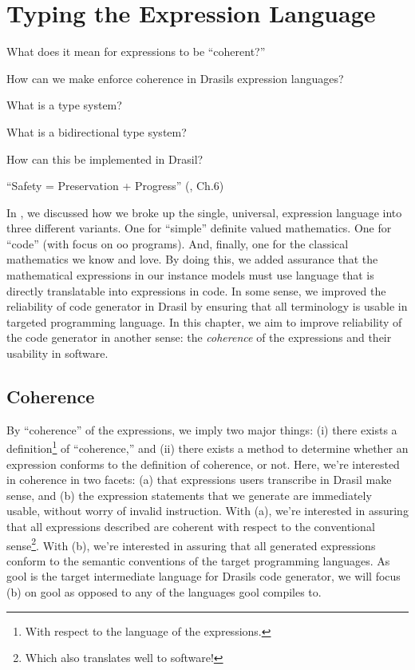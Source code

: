 \chapter{Typing the Expression Language}
\label{chap:typedExpr}

\begin{writingdirectives}
      \item What does it mean for expressions to be ``coherent?''
      \item How can we make enforce coherence in Drasils expression languages?
      \item What is a type system?
      \item What is a bidirectional type system?
      \item How can this be implemented in Drasil?
      \item ``Safety = Preservation + Progress'' (\cite{Harper2016}, Ch.6)
\end{writingdirectives}

In , we discussed how we broke up the single,
universal, expression language into three different variants. One for ``simple''
definite valued mathematics. One for ``code'' (with focus on \acs{oo} programs).
And, finally, one for the classical mathematics we know and love. By doing this,
we added assurance that the mathematical expressions in our instance models must
use language that is directly translatable into expressions in code. In some
sense, we improved the reliability of code generator in Drasil by ensuring that
all terminology is usable in targeted programming language. In this chapter, we
aim to improve reliability of the code generator in another sense: the
\textit{coherence} of the expressions and their usability in software.

\section{Coherence}
\label{chap:typedExpr:sec:coherence}

By ``coherence'' of the expressions, we imply two major things: (i) there exists
a definition\footnote{With respect to the language of the expressions.} of
``coherence,'' and (ii) there exists a method to determine whether an expression
conforms to the definition of coherence, or not. Here, we're interested in
coherence in two facets: (a) that expressions users transcribe in Drasil make
sense, and (b) the expression statements that we generate are immediately
usable, without worry of invalid instruction. With (a), we're interested in
assuring that all expressions described are coherent with respect to the
conventional sense\footnote{Which also translates well to software!}. With (b),
we're interested in assuring that all generated expressions conform to the
semantic conventions of the target programming languages. As \acs{gool} is the
target intermediate language for Drasils code generator, we will focus (b) on
\acs{gool} as opposed to any of the languages \acs{gool} compiles to.


